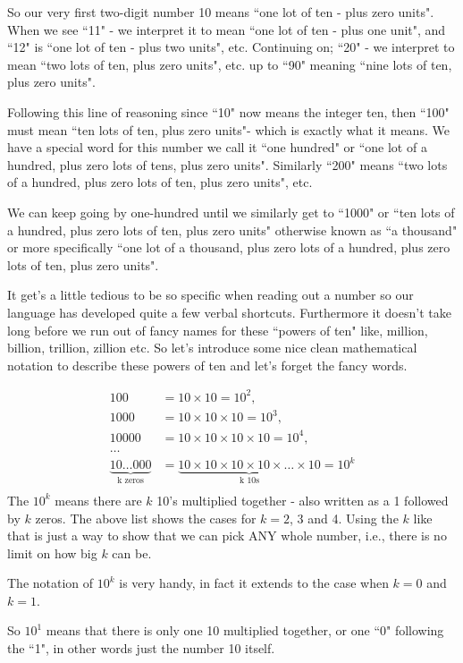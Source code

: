 \documentclass{article}
\begin{document}
So our very first two-digit number 10 means ``one lot of ten - plus zero units".
When we see ``11" - we interpret it to mean ``one lot of ten - plus one unit",
and ``12" is ``one lot of ten - plus two units", etc.
Continuing on; ``20" - we interpret to mean ``two lots of ten,
plus zero units", etc.  up to ``90" meaning ``nine lots of ten,
plus zero units".

Following this line of reasoning since ``10" now means the integer ten,
then ``100" must mean ``ten lots of ten,
plus zero units"- which is exactly what it means.
We have a special word for this number we call it ``one hundred" or ``one lot of a hundred,
plus zero lots of tens, plus zero units".
Similarly ``200" means ``two lots of a hundred, plus zero lots of ten,
plus zero units", etc.

We can keep going by one-hundred until we similarly get to ``1000" or ``ten lots of a hundred,
plus zero lots of ten, plus zero units" otherwise known
as ``a thousand" or more specifically ``one lot of a thousand,
plus zero lots of a hundred, plus zero lots of ten, plus zero units".

It get's a little tedious to be so specific when reading out
a number so our language has developed quite a few verbal shortcuts.
Furthermore it doesn't take long before we run out of fancy names
for these ``powers of ten" like, million, billion, trillion,
zillion etc.  So let's introduce some nice clean mathematical notation
to describe these powers of ten and let's forget the fancy words.

\begin{align*}
100&=10\times10=10^2,\\
1000&= 10\times10\times10=10^3,\\
10000&= 10\times10\times10\times10=10^4,\\
\dots{}\\
\underbrace{10\dots{}000}_\text{k zeros}&= \underbrace{10\times10\times10\times10\times\dots{}\times10}_\text{k 10s}=10^k\\
\end{align*}
The $10^k$ means there are  $k$  10's multiplied together - 
also written as a 1 followed by  $k$  zeros.
The above list shows the cases for $k = 2$, 3 and 4.
Using the $k$  like that is just a way to show that we can pick ANY whole number,
i.e., there is no limit on how big $k$ can be.

The notation of $10^k$ is very handy, in fact it extends to the case when $k=0$ and $k=1$.

So $10^1$ means that there is only one 10 multiplied together, or one ``0" following the ``1",
in other words just the number 10 itself.
\end{document}
